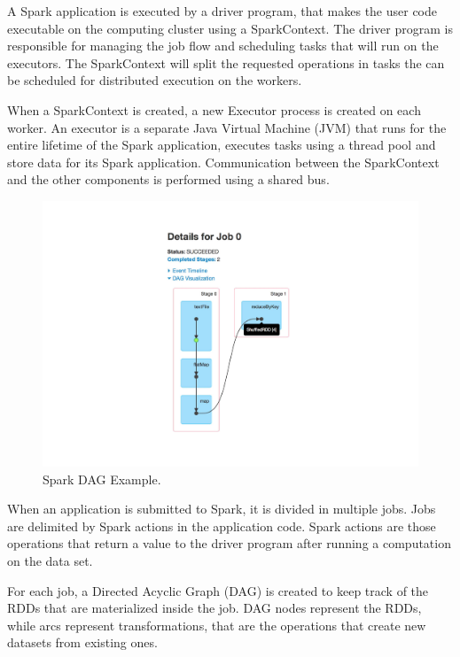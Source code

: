 A Spark application is executed by a driver program, that makes the user code executable on the computing cluster using a SparkContext. The driver program is responsible for managing the job flow and scheduling tasks that will run on the executors. The SparkContext will split the requested operations in tasks the can be scheduled for distributed execution on the workers. 

When a SparkContext is created, a new Executor process is created on each worker. An executor is a separate Java Virtual Machine (JVM) that runs for the entire lifetime of the Spark application, executes tasks using a thread pool and store data for its Spark application. Communication between the SparkContext and the other components is performed using a shared bus.
\begin{figure}
	\vspace{-1.5cm}
	\centering
	\includegraphics[width=\columnwidth]{Images/spark_dag_example.pdf}  
	\vspace{-1.5cm}
	\caption[Spark DAG Example]{Spark DAG Example.}
	\label{fig:sparkDAGExample}
\end{figure}

When an application is submitted to Spark, it is divided in multiple jobs. Jobs are delimited by Spark actions in the application code. Spark actions are those operations that return a value to the driver program after running a computation on the data set.

For each job, a Directed Acyclic Graph (DAG) is created to keep track of the RDDs that are materialized inside the job. DAG nodes represent the RDDs, while arcs represent transformations, that are the operations that create new datasets from existing ones.

